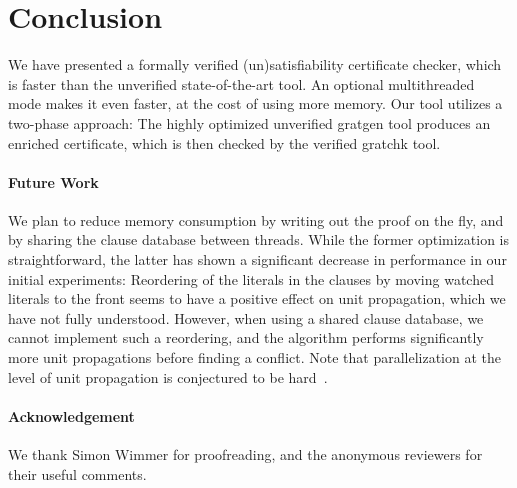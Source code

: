 \documentclass{llncs}
\begin{document}
\section{Conclusion}
We have presented a formally verified (un)satisfiability certificate checker, which is faster than the unverified state-of-the-art tool.
An optional multithreaded mode makes it even faster, at the cost of using more memory.
Our tool utilizes a two-phase approach: The highly optimized unverified gratgen tool produces an enriched certificate, which is then checked by the verified gratchk tool.

\paragraph{Future Work}
We plan to reduce memory consumption by writing out the proof on the fly,
and by sharing the clause database between threads. While the former optimization is straightforward, the latter has shown a significant decrease 
in performance in our initial experiments: Reordering of the literals in the clauses by moving watched literals to the front seems to have a positive effect on 
unit propagation, which we have not fully understood. However, when using a shared clause database, we cannot implement such a reordering, and the algorithm 
performs significantly more unit propagations before finding a conflict. Note that parallelization at the level of unit propagation is conjectured to be hard~\cite{HW13}.

\paragraph{Acknowledgement}
We thank Simon Wimmer for proofreading, and the anonymous reviewers for their useful comments.
\end{document}
